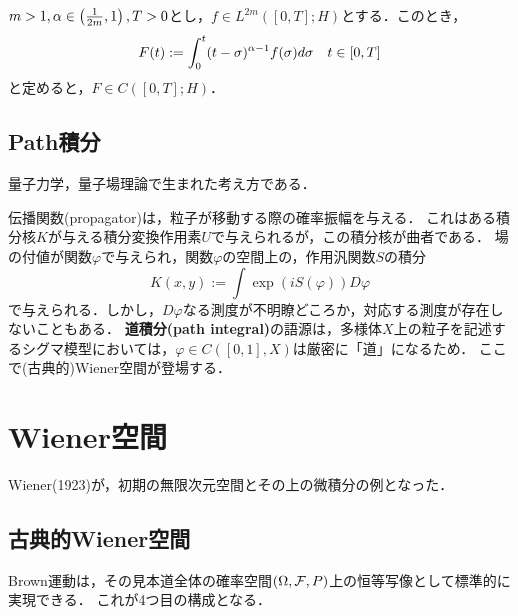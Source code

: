 \documentclass[uplatex,dvipdfmx]{jsreport}
\begin{document}
\begin{lemma}
    $m>1,\alpha\in\left(\frac{1}{2m},1\right),T>0$とし，$f\in L^{2m}([0,T];H)$とする．このとき，
    \[F(t):=\int^t_0(t-\sigma)^{\alpha-1}f(\sigma)d\sigma\quad t\in[0,T]\]
    と定めると，$F\in C([0,T];H)$．
\end{lemma}

\subsection{Path積分}

\begin{tcolorbox}[colframe=ForestGreen, colback=ForestGreen!10!white,breakable,colbacktitle=ForestGreen!40!white,coltitle=black,fonttitle=\bfseries\sffamily,
title=]
    量子力学，量子場理論で生まれた考え方である．
\end{tcolorbox}

\begin{discussion}
    伝播関数(propagator)は，粒子が移動する際の確率振幅を与える．
    これはある積分核$K$が与える積分変換作用素$U$で与えられるが，この積分核が曲者である．
    場の付値が関数$\varphi$で与えられ，関数$\varphi$の空間上の，作用汎関数$S$の積分
    \[K(x,y):=\int\exp(iS(\varphi))D\varphi\]
    で与えられる．しかし，$D\varphi$なる測度が不明瞭どころか，対応する測度が存在しないこともある．
    \textbf{道積分(path integral)}の語源は，多様体$X$上の粒子を記述するシグマ模型においては，$\varphi\in C([0,1],X)$は厳密に「道」になるため．
    ここで(古典的)Wiener空間が登場する．
\end{discussion}

\section{Wiener空間}

\begin{tcolorbox}[colframe=ForestGreen, colback=ForestGreen!10!white,breakable,colbacktitle=ForestGreen!40!white,coltitle=black,fonttitle=\bfseries\sffamily,
title=]
    Wiener(1923)が，初期の無限次元空間とその上の微積分の例となった．
\end{tcolorbox}

\subsection{古典的Wiener空間}

\begin{tcolorbox}[colframe=ForestGreen, colback=ForestGreen!10!white,breakable,colbacktitle=ForestGreen!40!white,coltitle=black,fonttitle=\bfseries\sffamily,
title=]
    Brown運動は，その見本道全体の確率空間$(\Omega,\mathcal{F},P)$上の恒等写像として標準的に実現できる．
    これが4つ目の構成となる．
\end{tcolorbox}
\end{document}
